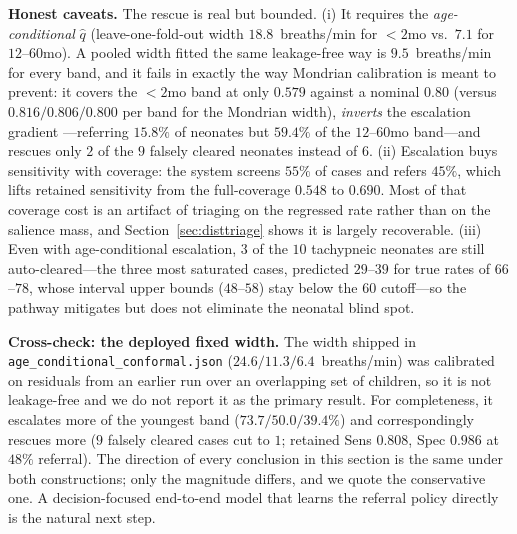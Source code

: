 \noindent\textbf{Honest caveats.} The rescue is real but bounded. (i) It requires the \emph{age-conditional}
$\hat q$ (leave-one-fold-out width $18.8$~breaths/min for $<2$mo vs.\ $7.1$ for $12$--$60$mo). A pooled
width fitted the same leakage-free way is $9.5$~breaths/min for every band, and it fails in exactly the way
Mondrian calibration is meant to prevent: it covers the $<2$mo band at only $0.579$ against a nominal
$0.80$ (versus $0.816/0.806/0.800$ per band for the Mondrian width), \emph{inverts} the escalation gradient
---referring $15.8\%$ of neonates but $59.4\%$ of the $12$--$60$mo band---and rescues only $2$ of the $9$
falsely cleared neonates instead of $6$. (ii) Escalation buys sensitivity with coverage: the system screens
$55\%$ of cases and refers $45\%$, which lifts retained sensitivity from the full-coverage $0.548$ to
$0.690$. Most of that coverage cost is an artifact of triaging on the regressed rate rather than on the
salience mass, and Section~\ref{sec:disttriage} shows it is largely recoverable. (iii) Even with age-conditional escalation, $3$ of the $10$ tachypneic neonates are still
auto-cleared---the three most saturated cases, predicted $29$--$39$ for true rates of $66$--$78$, whose
interval upper bounds ($48$--$58$) stay below the $60$ cutoff---so the pathway mitigates but does not
eliminate the neonatal blind spot.

\noindent\textbf{Cross-check: the deployed fixed width.} The width shipped in
\texttt{age\_conditional\_conformal.json} ($24.6/11.3/6.4$~breaths/min) was calibrated on residuals from an
earlier run over an overlapping set of children, so it is not leakage-free and we do not report it as the
primary result. For completeness, it escalates more of the youngest band ($73.7/50.0/39.4\%$) and
correspondingly rescues more ($9$ falsely cleared cases cut to $1$; retained Sens $0.808$, Spec $0.986$ at
$48\%$ referral). The direction of every conclusion in this section is the same under both constructions;
only the magnitude differs, and we quote the conservative one. A decision-focused end-to-end model that
learns the referral policy directly is the natural next step.
